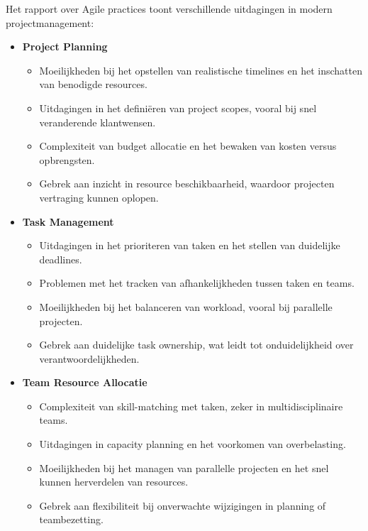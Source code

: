 Het \textcite{Atlassian2023} rapport over Agile practices toont verschillende uitdagingen in modern projectmanagement:

\begin{itemize}
    \item \textbf{Project Planning}
    \begin{itemize}
        \item Moeilijkheden bij het opstellen van realistische timelines en het inschatten van benodigde resources.
        \item Uitdagingen in het definiëren van project scopes, vooral bij snel veranderende klantwensen.
        \item Complexiteit van budget allocatie en het bewaken van kosten versus opbrengsten.
        \item Gebrek aan inzicht in resource beschikbaarheid, waardoor projecten vertraging kunnen oplopen.
    \end{itemize}
    
    \item \textbf{Task Management}
    \begin{itemize}
        \item Uitdagingen in het prioriteren van taken en het stellen van duidelijke deadlines.
        \item Problemen met het tracken van afhankelijkheden tussen taken en teams.
        \item Moeilijkheden bij het balanceren van workload, vooral bij parallelle projecten.
        \item Gebrek aan duidelijke task ownership, wat leidt tot onduidelijkheid over verantwoordelijkheden.
    \end{itemize}
    
    \item \textbf{Team Resource Allocatie}
    \begin{itemize}
        \item Complexiteit van skill-matching met taken, zeker in multidisciplinaire teams.
        \item Uitdagingen in capacity planning en het voorkomen van overbelasting.
        \item Moeilijkheden bij het managen van parallelle projecten en het snel kunnen herverdelen van resources.
        \item Gebrek aan flexibiliteit bij onverwachte wijzigingen in planning of teambezetting.
    \end{itemize}
    

\end{itemize}
